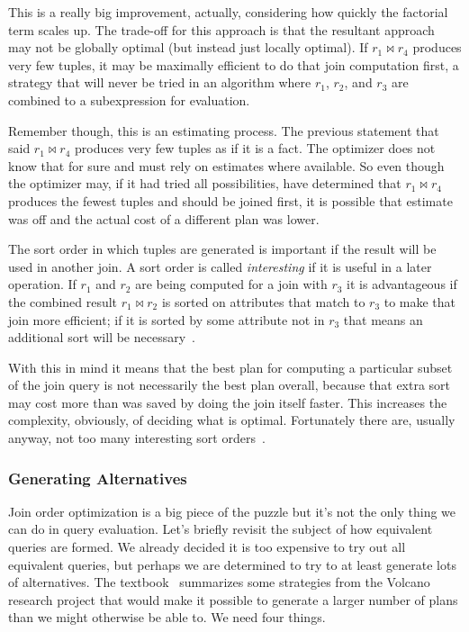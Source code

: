 \documentclass[a4paper]{report}
\begin{document}
This is a really big improvement, actually, considering how quickly the factorial term scales up. The trade-off for this approach is that the resultant approach may not be globally optimal (but instead just locally optimal). If $r_{1} \bowtie r_{4}$ produces very few tuples, it may be maximally efficient to do that join computation first, a strategy that will never be tried in an algorithm where $r_{1}$, $r_{2}$, and $r_{3}$ are combined to a subexpression for evaluation. 

Remember though, this is an estimating process. The previous statement that said $r_{1} \bowtie r_{4}$ produces very few tuples as if it is a fact. The optimizer does not know that for sure and must rely on estimates where available. So even though the optimizer may, if it had tried all possibilities, have determined that $r_{1} \bowtie r_{4}$ produces the fewest tuples and should be joined first, it is possible that estimate was off and the actual cost of a different plan was lower.

The sort order in which tuples are generated is important if the result will be used in another join. A sort order is called \textit{interesting} if it is useful in a later operation. If $r_{1}$ and $r_{2}$ are being computed for a join with $r_{3}$ it is advantageous if the combined result $r_{1} \bowtie r_{2}$ is sorted on attributes that match to $r_{3}$ to make that join more efficient; if it is sorted by some attribute not in $r_{3}$ that means an additional sort will be necessary~\cite{dsc}.

With this in mind it means that the best plan for computing a particular subset of the join query is not necessarily the best plan overall, because that extra sort may cost more than was saved by doing the join itself faster. This increases the complexity, obviously, of deciding what is optimal. Fortunately there are, usually anyway, not too many interesting sort orders~\cite{dsc}. 

\subsubsection*{Generating Alternatives}

Join order optimization is a big piece of the puzzle but it's not the only thing we can do in query evaluation. Let's briefly revisit the subject of how equivalent queries are formed. We already decided it is too expensive to try out all equivalent queries, but perhaps we are determined to try to at least generate lots of alternatives. The textbook~\cite{dsc} summarizes some strategies from the Volcano research project that would make it possible to generate a larger number of plans than we might otherwise be able to. We need four things.
\end{document}
